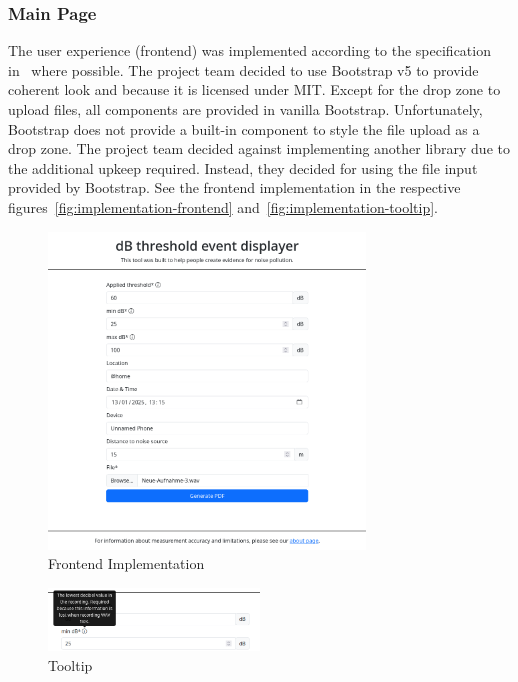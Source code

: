 \subsubsection{Main Page}\label{subsubsec:main-page}
The user experience (frontend) was implemented according to the specification in~ where possible.
The project team decided to use Bootstrap v5 to provide coherent look and because it is licensed under MIT. Except for the drop zone to upload files,
all components are provided in vanilla Bootstrap. Unfortunately, Bootstrap does not provide a built-in component to style the file upload as a drop zone.
The project team decided against implementing another library due to the additional upkeep required. Instead, they decided for using the file input provided by Bootstrap.
See the frontend implementation in the respective figures~\autoref{fig:implementation-frontend} and~\autoref{fig:implementation-tooltip}.
\begin{figure}[H]
    \centering
    \includegraphics[width=0.75\textwidth]{../assets/implementation_form.png}
    \caption{Frontend Implementation}\label{fig:implementation-frontend}
\end{figure}
\begin{figure}[H]
    \centering
    \includegraphics[width=0.5\textwidth]{../assets/implementation_tooltip.png}
    \caption{Tooltip}\label{fig:implementation-tooltip}
\end{figure}
